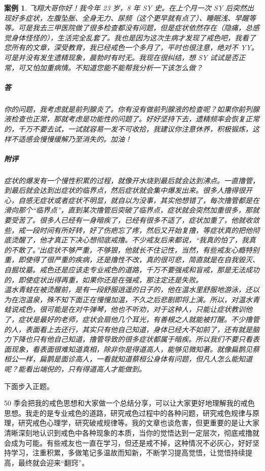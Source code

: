 \documentclass{ctexart}
\newtheorem{case}{案例}
\begin{document}
\begin{case}
    飞翔大哥你好！我今年 23 岁，8 年 SY 史。在上个月一次 SY 后突然出现好多症状，左腹坠胀、全身无力、尿频（这个更早就有点了）、睡眠浅、早醒等等。可是我去三甲医院做了很多检查都没有问题，但是症状依然存在（隐痛，总感觉身体怪怪的），生活完全乱套了。我也是因为这次生病才发现了戒色吧，我看了您所有的文章，深受教育，我已经戒色一个多月了，平时也很注意，绝对不 YY。可是并没有发生遗精现象，晨勃时有时无。我现在很纠结，想 SY 试试是否正常，可又怕加重病情。不知道您能不能帮我分析一下该怎么做？
    \subparagraph{答} 你的问题，我考虑就是前列腺炎了。你有没有做前列腺液的检查呢？如果你前列腺液检查也正常，那就考虑是功能性的问题了。好好坚持下去，遗精频率会恢复正常的，千万不要去试，一试就容易一发不可收拾，我建议你注意休养，积极锻炼，这样不适感会慢慢缓解乃至消失的。加油！
    \subparagraph{附评} 症状的爆发有一个慢性积累的过程，就像开水烧到最后就会达到沸点。一直撸管，到最后就会达到出症状的临界点，然后症状就会集中爆发出来。很多人撸得很开心，自感无症状或者症状不明显，就自以为没事，其实他想错了，每次撸管都是在滑向那个“临界点”，直到某次撸管后突破了临界点，症状就会突然加重很多，那就要受苦了。很多人已经有一身暗疾了，已经有很多不适了，症状加重了，他就收敛些，戒一段时间有所好转，好了伤疤忘了疼，然后又开始复撸，等症状真的把他彻底烫醒了，他才真正下决心想彻底戒撸。不少戒友后来都说，“我真的怕了，我真的不敢了。”出症状不够严重，不够狠，他就长不住记性，当然，有些戒友心瘾特别重，即使得了很严重的疾病，还是撸性不改，真的很可悲，简直就是在自我毁灭、自掘坟墓。戒色还是应该走专业戒色的道路，千万不要强戒和盲戒，那是无法成功的，即使症状出得再重，如果你还是在强戒，那注定还是失败。\\ 温水青蛙在被烫醒前，是有一段舒服逍遥的日子的，他在温水里舒服地游泳，还以为在泡温泉，殊不知下面正在慢慢加温，不久之后悲剧即将上演。所以，对温水青蛙说戒色，很可能是在对牛弹琴，他也不听劝，对于这种人，只能让症状教训他了，症状是最好的老师，症状会扇他几个耳光，有善根之人就能被打醒。不少撸管的人，表面看上去还行，其实只有他自己知道，身体已经大不如前了，还有就是脑力下降也只有他自己知道，撸管导致的很多症状都属于暗疾。所以我们不要只看表面现象，看表面很难知道真相，除非你是得道高人，能够见微知著。就像扁鹊见蔡桓公一样，扁鹊是面诊高人，一看就知道蔡桓公身体有问题，但凡人怎么能知道呢？能看出端倪的，只有得道高人才能做到。
\end{case}

下面步入正题。

50 季会把我的戒色思想和大家做一个总结分享，可以让大家更好地理解我的戒色思想。我走的是专业戒色的道路，研究戒色过程中的各种问题，研究戒色规律与原理，研究戒色心理学，研究破戒规律等。我的文章也谈危害，但更重要的是让大家清晰深刻地认识到戒色中各种现象的本质，当你的觉悟达到一定层次，彻底戒撸就会成为可能。有些戒友也一直在学习，但还是戒不掉，这种情况不必灰心，好好坚持学习，注重积累，多做笔记多温故而知新，不断学习提高觉悟，让觉悟持续提高，最终就会迎来“翻窍”。
\end{document}
